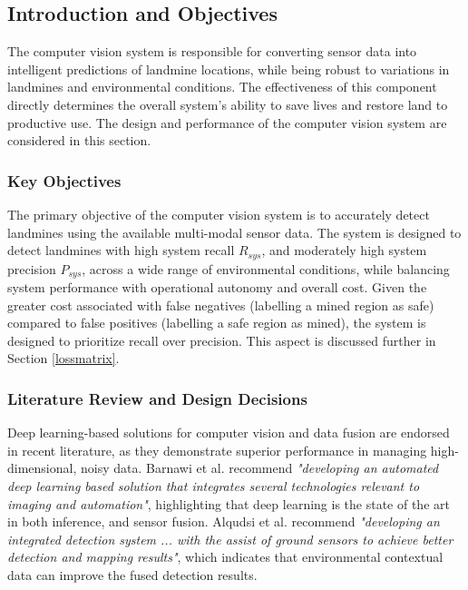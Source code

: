 \subsection{Introduction and Objectives} \label{compvis_intro}

     \noindent The computer vision system is responsible for converting sensor data into intelligent predictions of landmine locations, while being robust to variations in landmines and environmental conditions. The effectiveness of this component directly determines the overall system’s ability to save lives and restore land to productive use. The design and performance of the computer vision system are considered in this section. 
     
    \subsubsection{Key Objectives}
    
        \noindent The primary objective of the computer vision system is to accurately detect landmines using the available multi-modal sensor data. The system is designed to detect landmines with high system recall $R_{sys}$, and moderately high system precision $P_{sys}$, across a wide range of environmental conditions, while balancing system performance with operational autonomy and overall cost. Given the greater cost associated with false negatives (labelling a mined region as safe) compared to false positives (labelling a safe region as mined), the system is designed to prioritize recall over precision. This aspect is discussed further in Section \ref{lossmatrix}.

    \subsubsection{Literature Review and Design Decisions} 
    
        Deep learning-based solutions for computer vision and data fusion are endorsed in recent literature, as they demonstrate superior performance in managing high-dimensional, noisy data. Barnawi et al. \cite{barnawi2022review} recommend \textit{"developing an automated deep learning based solution that integrates several technologies relevant to imaging and automation"}, highlighting that deep learning is the state of the art in both inference, and sensor fusion. Alqudsi et al. \cite{alqudsi2021review} recommend \textit{"developing an integrated detection system ... with the assist of ground sensors to achieve better detection and mapping results"}, which indicates that environmental contextual data can improve the fused detection results.
    
